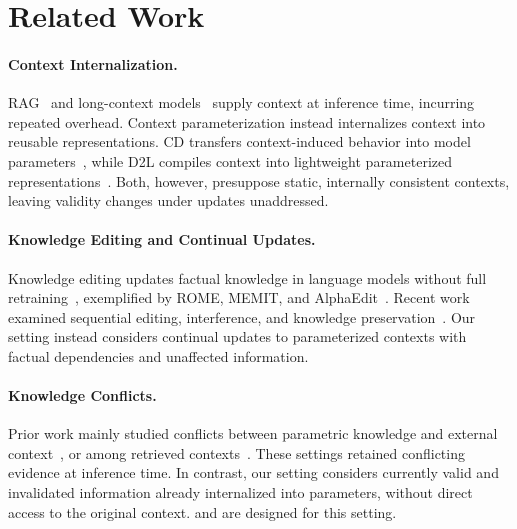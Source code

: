 \section{Related Work}
\label{sec:related-work}

\paragraph{Context Internalization.}

RAG~\citep{gao2023retrieval} and long-context models~\citep{ding2023longnet} supply context at inference time, incurring repeated overhead.
Context parameterization instead internalizes context into reusable representations.
CD transfers context-induced behavior into model parameters~\citep{snell2022learning}, while D2L compiles context into lightweight parameterized representations~\citep{charakorn2026doc}.
Both, however, presuppose static, internally consistent contexts, leaving validity changes under updates unaddressed.


\paragraph{Knowledge Editing and Continual Updates.}
Knowledge editing updates factual knowledge in language models without full retraining~\citep{yao2023editing}, exemplified by ROME, MEMIT, and AlphaEdit~\citep{meng2022locating,meng2023massediting,fang2025alphaedit}.
Recent work examined sequential editing, interference, and knowledge preservation~\citep{wang2024knowledge,chen2024lifelong,jiang2024learning,li2025reinforced}.
Our setting instead considers continual updates to parameterized contexts with factual dependencies and unaffected information.


\paragraph{Knowledge Conflicts.}
Prior work mainly studied conflicts between parametric knowledge and external context~\citep{xie2024adaptive,shi2024ircan}, or among retrieved contexts~\citep{cattan2025dragged,xu2024knowledge}.
These settings retained conflicting evidence at inference time.
In contrast, our setting considers currently valid and invalidated information already internalized into parameters, without direct access to the original context.
\benchmark{} and \method{} are designed for this setting.
